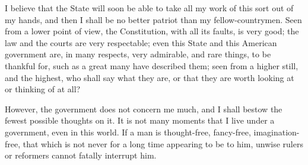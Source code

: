 \documentclass[letterpaper,12pt]{article}
\begin{document}
I believe that the State will soon be able to take all my work of this sort out
of my hands, and then I shall be no better patriot than my fellow-countrymen.
Seen from a lower point of view, the Constitution, with all its faults, is very
good; the law and the courts are very respectable; even this State and this
American government are, in many respects, very admirable, and rare things, to
be thankful for, such as a great many have described them; seen from a higher
still, and the highest, who shall say what they are, or that they are worth
looking at or thinking of at all?

However, the government does not concern me much, and I shall bestow the fewest
possible thoughts on it. It is not many moments that I live under a government,
even in this world. If a man is thought-free, fancy-free, imagination-free, that
which is not never for a long time appearing to be to him, unwise rulers or
reformers cannot fatally interrupt him.
\end{document}
